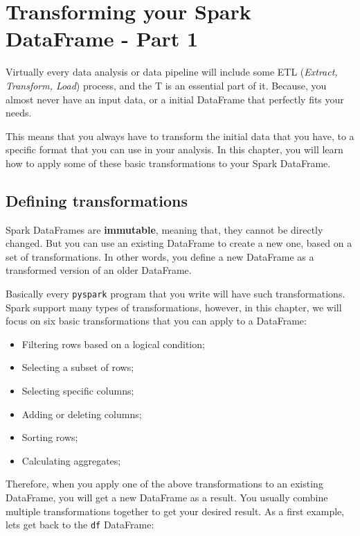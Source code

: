 \documentclass[
  11pt,
  letterpaper,
  DIV=11,
  numbers=noendperiod]{scrreprt}
\providecommand{\tightlist}{%
  \setlength{\itemsep}{0pt}\setlength{\parskip}{0pt}}\usepackage{longtable,booktabs,array}
\begin{document}

\hypertarget{sec-transforming-dataframes-part1}{%
\chapter{Transforming your Spark DataFrame - Part
1}\label{sec-transforming-dataframes-part1}}

Virtually every data analysis or data pipeline will include some ETL
(\emph{Extract, Transform, Load}) process, and the T is an essential
part of it. Because, you almost never have an input data, or a initial
DataFrame that perfectly fits your needs.

This means that you always have to transform the initial data that you
have, to a specific format that you can use in your analysis. In this
chapter, you will learn how to apply some of these basic transformations
to your Spark DataFrame.

\hypertarget{sec-df-defining-transformations}{%
\section{Defining
transformations}\label{sec-df-defining-transformations}}

Spark DataFrames are \textbf{immutable}, meaning that, they cannot be
directly changed. But you can use an existing DataFrame to create a new
one, based on a set of transformations. In other words, you define a new
DataFrame as a transformed version of an older DataFrame.

Basically every \texttt{pyspark} program that you write will have such
transformations. Spark support many types of transformations, however,
in this chapter, we will focus on six basic transformations that you can
apply to a DataFrame:

\begin{itemize}
\tightlist
\item
  Filtering rows based on a logical condition;
\item
  Selecting a subset of rows;
\item
  Selecting specific columns;
\item
  Adding or deleting columns;
\item
  Sorting rows;
\item
  Calculating aggregates;
\end{itemize}

Therefore, when you apply one of the above transformations to an
existing DataFrame, you will get a new DataFrame as a result. You
usually combine multiple transformations together to get your desired
result. As a first example, lets get back to the \texttt{df} DataFrame:
\end{document}
